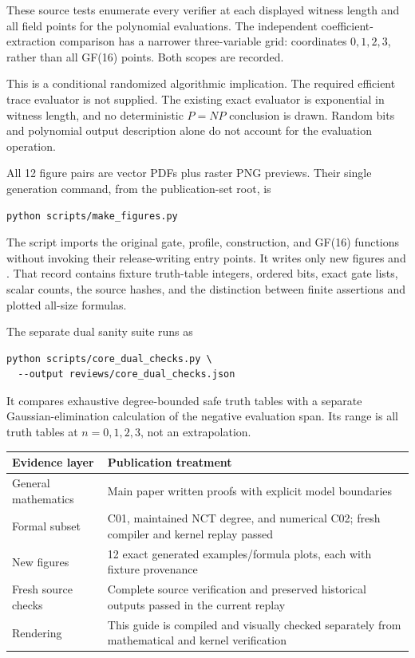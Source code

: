 These source tests enumerate every verifier at each displayed witness length
and all field points for the polynomial evaluations. The independent
coefficient-extraction comparison has a narrower three-variable grid:
coordinates $0,1,2,3$, rather than all GF(16) points. Both scopes are recorded.

This is a conditional randomized algorithmic implication. The required
efficient trace evaluator is not supplied. The existing exact evaluator is
exponential in witness length, and no deterministic $P=NP$ conclusion is
drawn. Random bits and polynomial output description alone do not account
for the evaluation operation.


All 12 figure pairs are vector PDFs plus raster PNG previews. Their single
generation command, from the publication-set root, is
\begin{lstlisting}
python scripts/make_figures.py
\end{lstlisting}
The script imports the original gate, profile, construction, and GF(16)
functions without invoking their release-writing entry points. It writes
only new figures and . That record contains
fixture truth-table integers, ordered bits, exact gate lists, scalar counts,
the source hashes, and the distinction between finite assertions and
plotted all-size formulas.

The separate dual sanity suite runs as
\begin{lstlisting}
python scripts/core_dual_checks.py \
  --output reviews/core_dual_checks.json
\end{lstlisting}
It compares exhaustive degree-bounded safe truth tables with a separate
Gaussian-elimination calculation of the negative evaluation span. Its
range is all truth tables at $n=0,1,2,3$, not an extrapolation.

\begin{tabularx}{\textwidth}{@{}p{1.4in}X@{}}\toprule
Evidence layer & Publication treatment\\\midrule
General mathematics & Main paper written proofs with explicit model boundaries\\
Formal subset & C01, maintained NCT degree, and numerical C02; fresh compiler and kernel replay passed\\
New figures & 12 exact generated examples/formula plots, each with fixture provenance\\
Fresh source checks & Complete source \code{--all} verification and preserved historical outputs passed in the current replay\\
Rendering & This guide is compiled and visually checked separately from mathematical and kernel verification\\\bottomrule
\end{tabularx}

